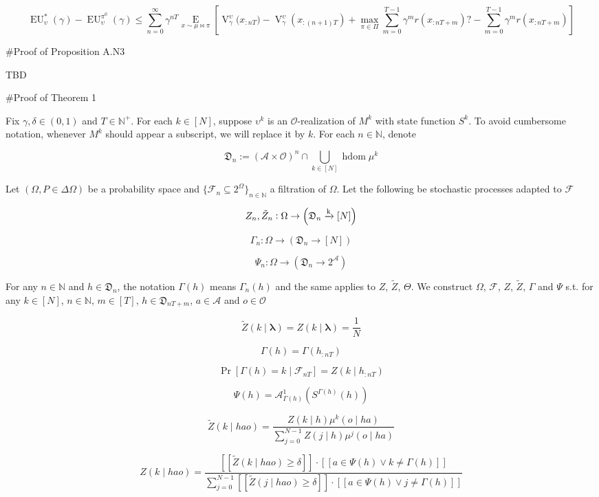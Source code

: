\documentclass[a4paper]{article}
\newcommand{\E}[1]{\underset{#1}{\operatorname{E}}}
\newcommand{\Nats}{\mathbb{N}}
\newcommand{\Sq}[2]{\{#1\}_{#2 \in \Nats}}
\newcommand{\Sqn}[1]{\Sq{#1}{n}}
\newcommand{\Estr}{\boldsymbol{\lambda}}
\newcommand{\M}{\xrightarrow{\textnormal{k}}}
\newcommand{\Ob}{\mathcal{O}}
\newcommand{\A}{\mathcal{A}}
\DeclareMathOperator{\HD}{hdom}
\newcommand{\V}{\operatorname{V}}
\newcommand{\EU}{\operatorname{EU}}
\newcommand{\Do}{\mathfrak{D}}
\newcommand{\F}{\mathcal{F}}
\newcommand{\Z}{Z}
\begin{document}
$$\EU^*_\upsilon(\gamma)-\EU^{\pi^0}_\upsilon(\gamma) \leq \sum_{n=0}^\infty \gamma^{nT}\E{x \sim \mu\bowtie\pi}\left[\V_\gamma^\upsilon\Big(x_{:nT}\Big)-\V_\gamma^\upsilon\left(x_{:(n+1)T}\right)+\max_{\pi \in \Pi}{\sum_{m = 0}^{T-1}}\gamma^m r\left(x_{:nT+m}\right)?-\sum_{m = 0}^{T-1}{\gamma^m r\left(x_{:nT+m}\right)}\right]$$

\#Proof of Proposition A.N3

TBD

\#Proof of Theorem 1

Fix $\gamma,\delta \in (0,1)$ and $T \in \Nats^+$. For each $k \in [N]$, suppose $\upsilon^k$ is an $\Ob$-realization of $M^k$ with state function $S^k$. To avoid cumbersome notation, whenever $M^k$ should appear a subscript, we will replace it by $k$. For each $n \in \Nats$, denote 

$$\Do_n:=(\A \times \Ob)^n \cap \bigcup_{k \in [N]} \HD{\mu^k}$$

Let $(\Omega,P \in \Delta\Omega)$ be a probability space and $\Sqn{\F_n \subseteq 2^\Omega}$ a filtration of $\Omega$. Let the following be stochastic processes adapted to $\F$

$$\Z_n,\tilde{\Z}_n: \Omega \rightarrow \left(\Do_n \M [N]\right)$$

$$\Gamma_n: \Omega \rightarrow \left(\Do_n \rightarrow [N]\right)$$

$$\Psi_n: \Omega \rightarrow \left(\Do_n \rightarrow 2^\A\right)$$

For any $n \in \Nats$ and $h \in \Do_n$, the notation $\Gamma(h)$ means $\Gamma_n(h)$ and the same applies to $\Z$, $\tilde{\Z}$, $\Theta$. We construct $\Omega$, $\F$, $\Z$, $\tilde{\Z}$, $\Gamma$ and $\Psi$ s.t. for any $k \in [N]$, $n \in \Nats$, $m \in [T]$, $h \in \Do_{nT+m}$, $a \in \A$ and $o \in \Ob$

$$\tilde{\Z}(k \mid \Estr)=\Z(k \mid \Estr)=\frac{1}{N}$$

$$\Gamma\left(h\right)=\Gamma\left(h_{:nT}\right)$$

$$\Pr\left[\Gamma(h)=k \mid \F_{nT}\right] = \Z\left(k \mid h_{:nT}\right)$$

$$\Psi(h) = \A^1_{\Gamma(h)}\left(S^{\Gamma(h)}(h)\right)$$


$$\tilde{\Z}(k \mid hao)=\frac{\Z(k \mid h) \mu^k(o \mid ha)}{\sum_{j = 0}^{N-1} \Z(j \mid h) \mu^j(o \mid ha)}$$

$$\Z(k \mid hao) = \frac{[[\tilde{\Z}(k \mid hao) \geq \delta]]\cdot[[a \in \Psi(h) \lor k \ne \Gamma(h)]]}{\sum_{j = 0}^{N-1}[[\tilde{\Z}(j \mid hao) \geq \delta]]\cdot[[a \in \Psi(h) \lor j \ne \Gamma(h)]]}$$
\end{document}
